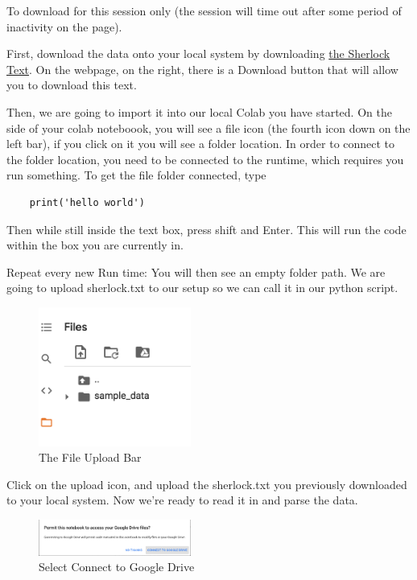 \documentclass{article}
\begin{document}
To download for this session only (the session will time out after some period of inactivity on the page).

First, download the data onto your local system by downloading 
\href{https://github.com/CatMcQueen/catmcqueen.github.io/blob/b67a282c9be6bfd1ed17796c2507b9108cffb6bc/sherlock.txt}{the Sherlock Text}. On the webpage, on the right, there is a Download button that will allow you to download this text.

Then, we are going to import it into our local Colab you have started. On the side of your colab noteboook, you will see a file icon (the fourth icon down on the left bar), if you click on it you will see a folder location. In order to connect to the folder location, you need to be connected to the runtime, which requires you run something. To get the file folder connected, type
\begin{verbatim}
    print('hello world')
\end{verbatim} 
Then while still inside the text box, press shift and Enter. This will run the code within the box you are currently in.

Repeat every new Run time:
You will then see an empty folder path. We are going to upload sherlock.txt to our setup so we can call it in our python script.

\begin{figure}[h!]
\centering
\includegraphics[width=50mm]{FileFolder.png}
\caption{The File Upload Bar}
\label{fig:filefolder}
\end{figure}

Click on the upload icon, and upload the sherlock.txt you previously downloaded to your local system. Now we're ready to read it in and parse the data.

\begin{figure}[h!]
\centering
\includegraphics[width=50mm]{GoogleDriveConnect.png}
\caption{Select Connect to Google Drive}
\label{fig:connectdrive}
\end{figure}
\end{document}
